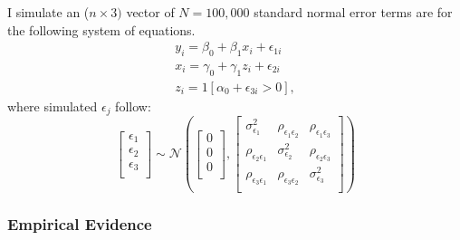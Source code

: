 \documentclass{article}[11pt,subeqn]
\begin{document}
\begin{spacing}{1.25}
I simulate an ($n \times 3)$ vector of $N=100,000$ standard normal error terms are for the following system of equations.\\
\begin{eqnarray}
\label{eqn:MC1}
y_i=\beta_0+\beta_1 x_i + \epsilon_{1i} \nonumber\\
x_i=\gamma_0 + \gamma_1 z_i + \epsilon_{2i} \nonumber\\
z_i=1[\alpha_0+\epsilon_{3i}>0], \nonumber
\end{eqnarray} 
where simulated $\epsilon_j$ follow:
\begin{equation}
\begin{bmatrix}
\epsilon_1\\
\epsilon_2\\
\epsilon_3\\
\end{bmatrix}
\sim \mathcal{N}
\left(\begin{bmatrix}
0\\
0\\
0\\
\end{bmatrix}
,
\begin{bmatrix}
\sigma_{\epsilon_1}^2 &  \rho_{\epsilon_1\epsilon_2} &  \rho_{\epsilon_1\epsilon_3}\\
\rho_{\epsilon_2\epsilon_1} & \sigma_{\epsilon_2}^2 &  \rho_{\epsilon_2\epsilon_3} \\
\rho_{\epsilon_3\epsilon_1}&  \rho_{\epsilon_3\epsilon_2}& \sigma_{\epsilon_3}^2 \\
\end{bmatrix}\right)
\end{equation}


\subsubsection{Empirical Evidence}
\label{scn:EE}

\end{spacing}
\end{document}
